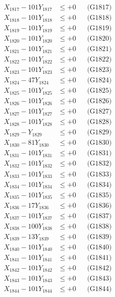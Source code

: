 \documentclass[a4paper,10pt]{article}
\begin{document}
{\begin{align}
X_{1817} - 101Y_{1817} &\leq +0 && \text{(G1817)} \\
X_{1818} - 101Y_{1818} &\leq +0 && \text{(G1818)} \\
X_{1819} - 101Y_{1819} &\leq +0 && \text{(G1819)} \\
X_{1820} - 101Y_{1820} &\leq +0 && \text{(G1820)} \\
\allowbreak
X_{1821} - 101Y_{1821} &\leq +0 && \text{(G1821)} \\
X_{1822} - 101Y_{1822} &\leq +0 && \text{(G1822)} \\
X_{1823} - 101Y_{1823} &\leq +0 && \text{(G1823)} \\
X_{1824} - 47Y_{1824} &\leq +0 && \text{(G1824)} \\
X_{1825} - 101Y_{1825} &\leq +0 && \text{(G1825)} \\
X_{1826} - 101Y_{1826} &\leq +0 && \text{(G1826)} \\
X_{1827} - 101Y_{1827} &\leq +0 && \text{(G1827)} \\
X_{1828} - 101Y_{1828} &\leq +0 && \text{(G1828)} \\
X_{1829} - Y_{1829} &\leq +0 && \text{(G1829)} \\
X_{1830} - 81Y_{1830} &\leq +0 && \text{(G1830)} \\
\allowbreak
X_{1831} - 101Y_{1831} &\leq +0 && \text{(G1831)} \\
X_{1832} - 101Y_{1832} &\leq +0 && \text{(G1832)} \\
X_{1833} - 101Y_{1833} &\leq +0 && \text{(G1833)} \\
X_{1834} - 101Y_{1834} &\leq +0 && \text{(G1834)} \\
X_{1835} - 101Y_{1835} &\leq +0 && \text{(G1835)} \\
X_{1836} - 17Y_{1836} &\leq +0 && \text{(G1836)} \\
X_{1837} - 101Y_{1837} &\leq +0 && \text{(G1837)} \\
X_{1838} - 100Y_{1838} &\leq +0 && \text{(G1838)} \\
X_{1839} - 13Y_{1839} &\leq +0 && \text{(G1839)} \\
X_{1840} - 101Y_{1840} &\leq +0 && \text{(G1840)} \\
\allowbreak
X_{1841} - 101Y_{1841} &\leq +0 && \text{(G1841)} \\
X_{1842} - 101Y_{1842} &\leq +0 && \text{(G1842)} \\
X_{1843} - 101Y_{1843} &\leq +0 && \text{(G1843)} \\
X_{1844} - 101Y_{1844} &\leq +0 && \text{(G1844)} \\

\end{align}}
\end{document}
